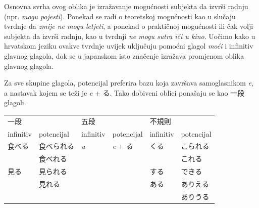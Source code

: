	
\newpage
{}

	
	Osnovna svrha ovog oblika je izražavanje mogućnosti subjekta da izvrši radnju (npr. \textit{mogu pojesti}).
	Ponekad se radi o teoretskoj mogućnosti kao u slučaju tvrdnje da \textit{zmije ne mogu letjeti}, a ponekad o praktičnoj mogućnosti ili čak volji subjekta da izvrši radnju, kao u tvrdnji \textit{ne mogu sutra ići u kino}.
	Uočimo kako u hrvatskom jeziku ovakve tvrdnje uvijek uključuju pomoćni glagol \textit{moći} i infinitiv glavnog glagola, dok se u japanskom isto značenje izražava promjenom oblika glavnog glagola.
	
	
	Za sve skupine glagola, potencijal preferira bazu koja završava samoglasnikom \textit{e}, a nastavak kojem se teži je \textit{e} + る.
	Tako dobiveni oblici ponašaju se kao 一段 glagoli.
	
	\begin{table}[h]
		\centering
			\begin{tabular}{l l l l l l}\toprule[2pt]
				一段 && 五段 && 不規則 &\\
				infinitiv & potencijal & infinitiv & potencijal & infinitiv & potencijal\\
				\midrule
				食べる & 食べられる & \textit{u} & \textit{e} + る & くる & こられる\\
				& 食べれる & & & & これる\footnotemark[3]\\
				見る & 見られる\footnotemark[2] & & & する & できる\\
				& 見れる & & & ある\footnotemark[4] & ありえる\\
				& & & & & ありうる\\
				\bottomrule[2pt]
			\end{tabular}
	\end{table}

	
